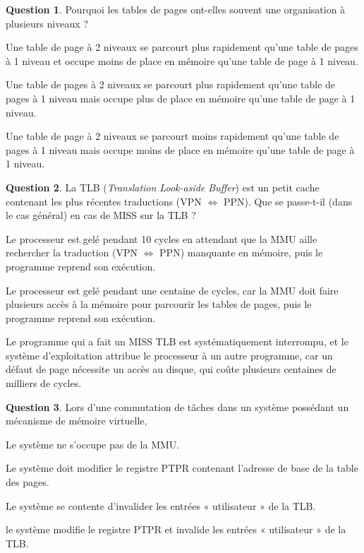 \documentclass[11pt,english,french]{scrreprt}
\theoremstyle{remark}
\theoremstyle{definition}
\newtheorem{ques}{Question}[section]
\begin{document}
\begin{ques}
	Pourquoi les tables de pages ont-elles souvent une organisation à plusieurs niveaux ?
\begin{description}
	\setlength{\itemsep}{2pt}
	\setlength{\parskip}{-1pt}
	\setlength{\parsep}{-1pt}
	\item[\Square] Une table de page à 2 niveaux se parcourt plus rapidement qu'une table de pages à 1 niveau et occupe moins de place en mémoire qu'une table de page à 1 niveau.
	\item[\Square] Une table de pages à 2 niveaux se parcourt plus rapidement qu'une table de pages à 1 niveau mais occupe plus de place en mémoire qu'une table de page à 1 niveau.
	\item[\CheckedBox] Une table de page à 2 niveaux se parcourt moins rapidement qu'une table de pages à 1 niveau mais occupe moins de place en mémoire qu'une table de page à 1 niveau.
\end{description}
\end{ques}

\begin{ques}
	La TLB (\emph{Translation Look-aside Buffer}) est un petit cache contenant les plus récentes traductions (VPN $\Leftrightarrow$ PPN). Que se passe-t-il (dans le cas général) en cas de MISS sur la TLB ?
\begin{description}
	\setlength{\itemsep}{2pt}
	\setlength{\parskip}{-1pt}
	\setlength{\parsep}{-1pt}
	\item[\Square] Le processeur est gelé pendant 10 cycles en attendant que la MMU aille rechercher la traduction (VPN $\Leftrightarrow$ PPN) manquante en mémoire, puis le programme reprend son exécution.
	\item[\CheckedBox] Le processeur est gelé pendant une centaine de cycles, car la MMU doit faire plusieurs accès à la mémoire pour parcourir les tables de pages, puis le programme reprend son exécution.
	\item[\Square] Le programme qui a fait un MISS TLB est systématiquement interrompu, et le système d'exploitation attribue le processeur à un autre programme, car un défaut de page nécessite un accès au disque, qui coûte plusieurs centaines de milliers de cycles.
\end{description}
\end{ques}

\begin{ques}
	Lors d'une commutation de tâches dans un système possédant un mécanisme de mémoire virtuelle,
\begin{description}
	\setlength{\itemsep}{2pt}
	\setlength{\parskip}{-1pt}
	\setlength{\parsep}{-1pt}
	\item[\Square] Le système ne s'occupe pas de la MMU.
	\item[\Square] Le système doit modifier le registre PTPR contenant l'adresse de base de la table des pages.
	\item[\Square] Le système se contente d'invalider les entrées « utilisateur » de la TLB.
	\item[\CheckedBox] le système modifie le registre PTPR et invalide les entrées « utilisateur » de la TLB.
\end{description}
\end{ques}
\end{document}

